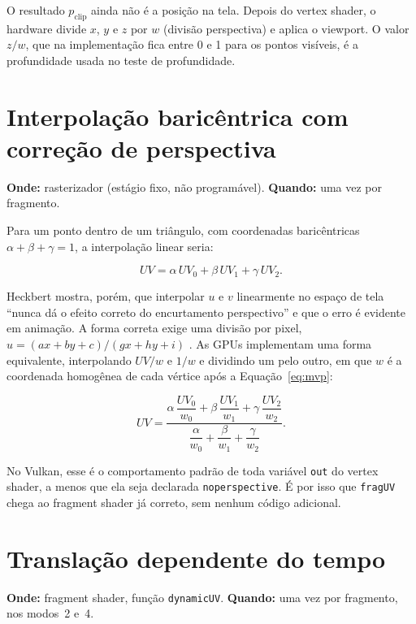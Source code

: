 O resultado \(p_{\text{clip}}\) ainda não é a posição na tela. Depois do vertex shader, o hardware divide \(x\), \(y\) e \(z\) por \(w\) (divisão perspectiva) e aplica o viewport. O valor \(z/w\), que na implementação fica entre 0 e 1 para os pontos visíveis, é a profundidade usada no teste de profundidade.

\section{Interpolação baricêntrica com correção de perspectiva}

\textbf{Onde:} rasterizador (estágio fixo, não programável). \textbf{Quando:} uma vez por fragmento.

Para um ponto dentro de um triângulo, com coordenadas baricêntricas \(\alpha+\beta+\gamma=1\), a interpolação linear seria:

\begin{equation}
UV=\alpha\, UV_0+\beta\, UV_1+\gamma\, UV_2.
\label{eq:baricentrica}
\end{equation}

Heckbert mostra, porém, que interpolar \(u\) e \(v\) linearmente no espaço de tela ``nunca dá o efeito correto do encurtamento perspectivo'' e que o erro é evidente em animação. A forma correta exige uma divisão por pixel, \(u=(ax+by+c)/(gx+hy+i)\) \cite[p.~5]{heckbert1986}. As GPUs implementam uma forma equivalente, interpolando \(UV/w\) e \(1/w\) e dividindo um pelo outro, em que \(w\) é a coordenada homogênea de cada vértice após a Equação~\eqref{eq:mvp}:

\begin{equation}
UV=\frac{\alpha\,\dfrac{UV_0}{w_0}+\beta\,\dfrac{UV_1}{w_1}+\gamma\,\dfrac{UV_2}{w_2}}
{\dfrac{\alpha}{w_0}+\dfrac{\beta}{w_1}+\dfrac{\gamma}{w_2}}.
\label{eq:perspectiva}
\end{equation}

No Vulkan, esse é o comportamento padrão de toda variável \texttt{out} do vertex shader, a menos que ela seja declarada \texttt{noperspective}. É por isso que \texttt{fragUV} chega ao fragment shader já correto, sem nenhum código adicional.

\section{Translação dependente do tempo}

\textbf{Onde:} fragment shader, função \texttt{dynamicUV}. \textbf{Quando:} uma vez por fragmento, nos modos~2 e~4.

